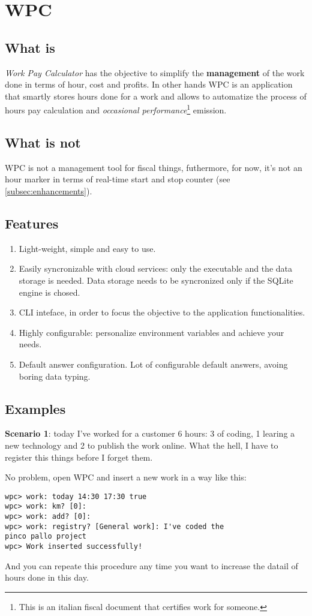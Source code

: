 \section{WPC}

\subsection{What is}
\textit{Work Pay Calculator} has the objective to simplify the \textbf{management} of the work done in terms of hour, cost and profits. In other hands WPC is an application that smartly stores hours done for a work and allows to automatize the process of hours pay calculation and \textit{occasional performance}\footnote{This is an italian fiscal document that certifies work for someone.} emission.

\subsection{What is not}
WPC is not a management tool for fiscal things, futhermore, for now, it's not an hour marker in terms of real-time start and stop counter (see \ref{subsec:enhancements}).

\subsection{Features}
\begin{enumerate}[label=(\alph*)]
\item Light-weight, simple and easy to use.
\item Easily syncronizable with cloud services: only the executable and the data storage is needed. Data storage needs to be syncronized only if the SQLite engine is chosed.
\item CLI inteface, in order to focus the objective to the application functionalities.
\item Highly configurable: personalize environment variables and achieve your needs.
\item Default answer configuration. Lot of configurable default answers, avoing boring data typing.
\end{enumerate}

\subsection{Examples}
\textbf{Scenario 1}: today I've worked for a customer 6 hours: 3 of coding, 1 learing a new technology and 2 to publish the work online. What the hell, I have to register this things before I forget them.

No problem, open WPC and insert a new work in a way like this:

\begin{lstlisting}
wpc> work: today 14:30 17:30 true
wpc> work: km? [0]: 
wpc> work: add? [0]: 
wpc> work: registry? [General work]: I've coded the
pinco pallo project
wpc> Work inserted successfully!
\end{lstlisting}

And you can repeate this procedure any time you want to increase the datail of hours done in this day.
